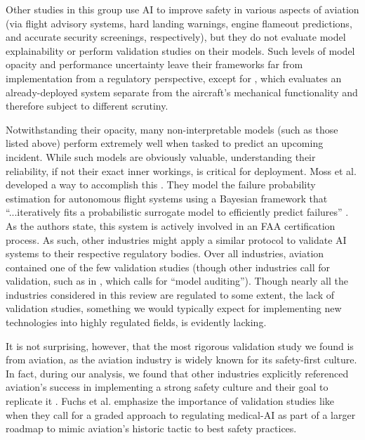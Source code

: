 \documentclass[authoryear,preprint,12pt]{elsarticle}
\begin{document}
Other studies in this group \cite{ramosNeedConceptualDesign2023,kongBayesianDeepLearning2022, khalidUseArtificialIntelligence2023,huegliEffectsFalseAlarms2025} use AI to improve safety in various
aspects of aviation (via flight advisory systems, hard landing warnings, engine
flameout predictions, and accurate security screenings, respectively), but they
do not evaluate model explainability or perform validation studies on their
models. Such levels of model opacity and performance uncertainty leave their
frameworks far from implementation from a regulatory perspective, except for
\cite{huegliEffectsFalseAlarms2025}, which evaluates an already-deployed system
separate from the aircraft's mechanical functionality and therefore subject to
different scrutiny.

Notwithstanding their opacity, many non-interpretable models (such as those
listed above) perform extremely well when tasked to predict an upcoming
incident. While such models are obviously valuable, understanding their
reliability, if not their exact inner workings, is critical for deployment. Moss
et al. developed a way to accomplish this
\cite{mossBayesianSafetyValidation2024}. They model the failure probability
estimation for autonomous flight systems using a Bayesian framework that
``...iteratively fits a probabilistic surrogate model to efficiently predict
failures'' \cite{mossBayesianSafetyValidation2024}. As the authors state, this
system is actively involved in an FAA certification process. As such, other
industries might apply a similar protocol to validate AI systems to their
respective regulatory bodies. Over all industries, aviation contained one of the
few validation studies (though other industries call for validation, such as in
\cite{mccraddenPatientSafetyQuality2020}, which calls for ``model auditing'').
Though nearly all the industries considered in this review are regulated to some
extent, the lack of validation studies, something we would typically expect for
implementing new technologies into highly regulated fields, is evidently
lacking. 

It is not surprising, however, that the most rigorous validation study we found
is from aviation, as the aviation industry is widely known for its safety-first
culture. In fact, during our analysis, we found that other industries explicitly
referenced aviation's success in implementing a strong safety culture and their
goal to replicate it \cite{fuchsLindberghsCockpitPredictive2025}. Fuchs et al.
\cite{fuchsLindberghsCockpitPredictive2025} emphasize the importance of
validation studies like \cite{mossBayesianSafetyValidation2024} when they call
for a graded approach to regulating medical-AI as part of a larger roadmap to
mimic aviation's historic tactic to best safety practices. 
\end{document}
